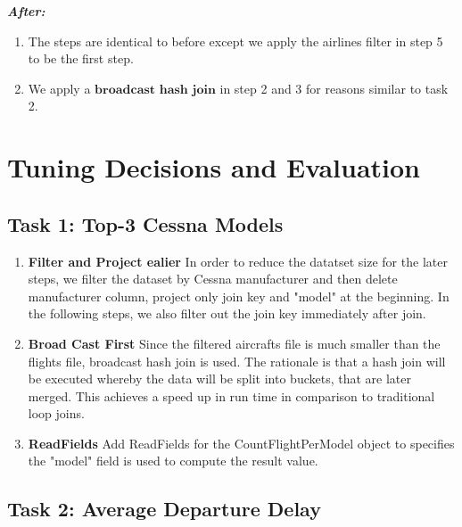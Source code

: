 \documentclass[12pt]{article}
\begin{document}
\textbf{\textit{After:}} 
\begin{enumerate}
    \item The steps are identical to before except we apply the airlines filter in step 5 to be the first step.
    \item We apply a $\textbf{broadcast hash join}$ in step 2 and 3 for reasons similar to task 2.
\end{enumerate}




\newpage{}

{}
\section*{Tuning Decisions and Evaluation}


\subsection*{Task 1: Top-3 Cessna Models}
\begin{enumerate}
  \item \textbf{Filter and Project ealier} In order to reduce the datatset size for the later steps, we filter the dataset by Cessna manufacturer and then delete manufacturer column, project only join key and  "model" at the beginning. In the following steps, we also filter out the join key immediately after join. 
  
  \item  \textbf{Broad Cast First} Since the filtered aircrafts file is much smaller than the flights file, broadcast hash join is used. The rationale is that a hash join will be executed whereby the data will be split into buckets, that are later merged. This achieves a speed up in run time in comparison to traditional loop joins.
  
  \item \textbf{ReadFields} Add ReadFields for the CountFlightPerModel object to specifies the "model" field is used to compute the result value. 
  
\end{enumerate}

\subsection*{Task 2: Average Departure Delay}
\end{document}
